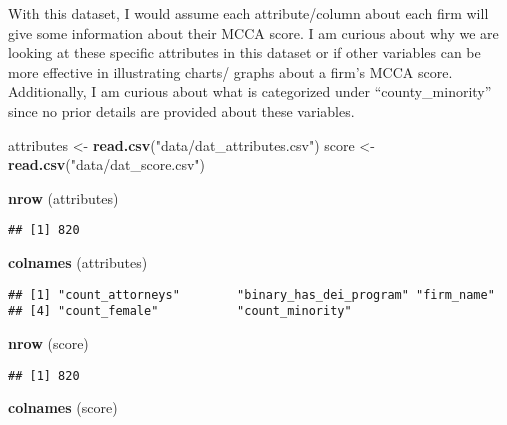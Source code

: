 \documentclass[
]{article}
\newenvironment{Shaded}{\begin{snugshade}}{\end{snugshade}}
\newcommand{\FunctionTok}[1]{\textcolor[rgb]{0.13,0.29,0.53}{\textbf{#1}}}
\newcommand{\NormalTok}[1]{#1}
\newcommand{\OtherTok}[1]{\textcolor[rgb]{0.56,0.35,0.01}{#1}}
\newcommand{\StringTok}[1]{\textcolor[rgb]{0.31,0.60,0.02}{#1}}
\begin{document}
With this dataset, I would assume each attribute/column about each firm
will give some information about their MCCA score. I am curious about
why we are looking at these specific attributes in this dataset or if
other variables can be more effective in illustrating charts/ graphs
about a firm's MCCA score. Additionally, I am curious about what is
categorized under ``county\_minority'' since no prior details are
provided about these variables.

\begin{Shaded}
\begin{Highlighting}[]
\NormalTok{attributes }\OtherTok{\textless{}{-}} \FunctionTok{read.csv}\NormalTok{(}\StringTok{"data/dat\_attributes.csv"}\NormalTok{)}
\NormalTok{score }\OtherTok{\textless{}{-}} \FunctionTok{read.csv}\NormalTok{(}\StringTok{"data/dat\_score.csv"}\NormalTok{)}

\FunctionTok{nrow}\NormalTok{ (attributes)}
\end{Highlighting}
\end{Shaded}

\begin{verbatim}
## [1] 820
\end{verbatim}

\begin{Shaded}
\begin{Highlighting}[]
\FunctionTok{colnames}\NormalTok{ (attributes)}
\end{Highlighting}
\end{Shaded}

\begin{verbatim}
## [1] "count_attorneys"        "binary_has_dei_program" "firm_name"             
## [4] "count_female"           "count_minority"
\end{verbatim}

\begin{Shaded}
\begin{Highlighting}[]
\FunctionTok{nrow}\NormalTok{ (score)}
\end{Highlighting}
\end{Shaded}

\begin{verbatim}
## [1] 820
\end{verbatim}

\begin{Shaded}
\begin{Highlighting}[]
\FunctionTok{colnames}\NormalTok{ (score)}
\end{Highlighting}
\end{Shaded}
\end{document}

